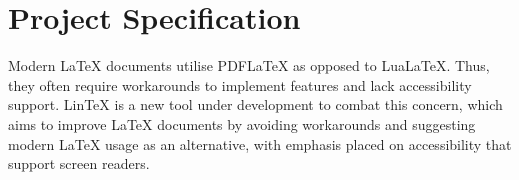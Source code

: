 \documentclass[11pt,titlepage,dvipsnames,table,xcdraw]{article}
\begin{document}
\clearpage

\section{Project Specification}

Modern LaTeX documents utilise PDFLaTeX as opposed to LuaLaTeX. Thus, they often require workarounds to implement features and lack accessibility support. LinTeX is a new tool under development to combat this concern, which aims to improve LaTeX documents by avoiding workarounds and suggesting modern LaTeX usage as an alternative, with emphasis placed on accessibility that support screen readers. 
\end{document}
